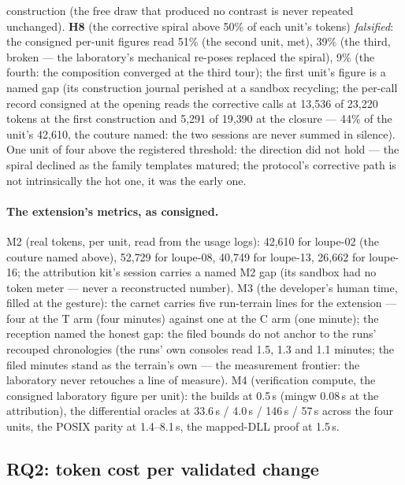 \documentclass[11pt,a4paper]{article}
\begin{document}
construction (the free draw that produced no contrast is never
repeated unchanged). \textbf{H8} (the
corrective spiral above 50\% of each unit's tokens) \emph{falsified}:
the consigned per-unit figures read 51\% (the second unit, met),
39\% (the third, broken --- the laboratory's mechanical re-poses
replaced the spiral), 9\% (the fourth: the composition converged at
the third tour); the first unit's figure is a named gap (its
construction journal perished at a sandbox recycling; the per-call
record consigned at the opening reads the corrective calls at
13{,}536 of 23{,}220 tokens at the first construction and 5{,}291 of
19{,}390 at the closure --- 44\% of the unit's 42{,}610, the couture
named: the two sessions are never summed in silence). One unit of
four above the registered threshold: the direction did not hold ---
the spiral declined as the family templates matured; the protocol's
corrective path is not intrinsically the hot one, it was the early
one.

\paragraph{The extension's metrics, as consigned.} M2 (real tokens,
per unit, read from the usage logs): 42{,}610 for loupe-02 (the
couture named above), 52{,}729 for loupe-08, 40{,}749 for loupe-13,
26{,}662 for loupe-16; the attribution kit's session carries a named
M2 gap (its sandbox had no token meter --- never a reconstructed
number). M3 (the developer's human time, filled at the gesture): the
carnet carries five run-terrain lines for the extension --- four at
the T arm (four minutes) against one at the C arm (one minute); the
reception named the honest gap: the filed bounds do not anchor to the
runs' recouped chronologies (the runs' own consoles read 1.5, 1.3 and
1.1 minutes; the filed minutes stand as the terrain's own --- the
measurement frontier: the laboratory never retouches a line of
measure). M4 (verification compute, the consigned laboratory figure
per unit): the builds at 0.5\,s (mingw 0.08\,s at the attribution),
the differential oracles at 33.6\,s / 4.0\,s / 146\,s / 57\,s
across the four units, the POSIX parity at 1.4--8.1\,s, the
mapped-DLL proof at 1.5\,s.



\subsection{RQ2: token cost per validated change}\label{sec:rq2}
\end{document}
